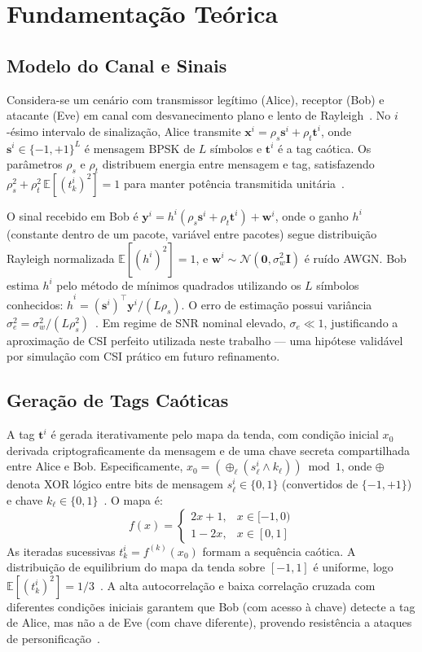 \documentclass[12pt,a4paper]{article}
\begin{document}
\section{Fundamentação Teórica}

\subsection{Modelo do Canal e Sinais}

Considera-se um cenário com transmissor legítimo (Alice), receptor (Bob) e atacante (Eve) em canal com desvanecimento plano e lento de Rayleigh~\cite{ref_poor}. No $i$-ésimo intervalo de sinalização, Alice transmite $\mathbf{x}^i = \rho_s \mathbf{s}^i + \rho_t \mathbf{t}^i$, onde $\mathbf{s}^i \in \{-1,+1\}^L$ é mensagem BPSK de $L$ símbolos e $\mathbf{t}^i$ é a tag caótica. Os parâmetros $\rho_s$ e $\rho_t$ distribuem energia entre mensagem e tag, satisfazendo $\rho_s^2 + \rho_t^2\,\mathbb{E}[(t_k^i)^2] = 1$ para manter potência transmitida unitária~\cite{ref_joao}.

O sinal recebido em Bob é $\mathbf{y}^i = h^i(\rho_s \mathbf{s}^i + \rho_t \mathbf{t}^i) + \mathbf{w}^i$, onde o ganho $h^i$ (constante dentro de um pacote, variável entre pacotes) segue distribuição Rayleigh normalizada $\mathbb{E}[(h^i)^2]=1$, e $\mathbf{w}^i \sim \mathcal{N}(\mathbf{0}, \sigma_w^2\mathbf{I})$ é ruído AWGN. Bob estima $h^i$ pelo método de mínimos quadrados utilizando os $L$ símbolos conhecidos: $\hat{h}^i = (\mathbf{s}^i)^\top \mathbf{y}^i/(L\rho_s)$. O erro de estimação possui variância $\sigma_e^2 = \sigma_w^2/(L\rho_s^2)$~\cite{ref_kay}. Em regime de SNR nominal elevado, $\sigma_e \ll 1$, justificando a aproximação de CSI perfeito utilizada neste trabalho --- uma hipótese validável por simulação com CSI prático em futuro refinamento.

\subsection{Geração de Tags Caóticas}

A tag $\mathbf{t}^i$ é gerada iterativamente pelo mapa da tenda, com condição inicial $x_0$ derivada criptograficamente da mensagem e de uma chave secreta compartilhada entre Alice e Bob. Especificamente, $x_0 = (\oplus_\ell (s_\ell^i \land k_\ell)) \bmod 1$, onde $\oplus$ denota XOR lógico entre bits de mensagem $s_\ell^i \in \{0,1\}$ (convertidos de $\{-1,+1\}$) e chave $k_\ell \in \{0,1\}$~\cite{ref_joao}. O mapa é:
\begin{equation}\label{eq:tentmap}
    f(x) = \begin{cases} 2x+1, & x \in [-1,0) \\ 1-2x, & x \in [0,1] \end{cases}
\end{equation}
As iteradas sucessivas $t_k^i = f^{(k)}(x_0)$ formam a sequência caótica. A distribuição de equilibrium do mapa da tenda sobre $[-1,1]$ é uniforme, logo $\mathbb{E}[(t_k^i)^2] = 1/3$~\cite{ref_poor}. A alta autocorrelação e baixa correlação cruzada com diferentes condições iniciais garantem que Bob (com acesso à chave) detecte a tag de Alice, mas não a de Eve (com chave diferente), provendo resistência a ataques de personificação~\cite{ref_joao}.
\end{document}

